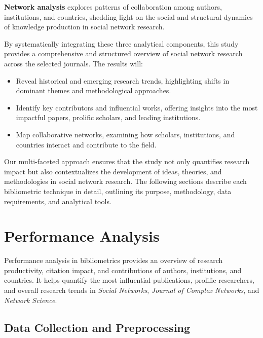 \documentclass[twocolumn]{article}
\begin{document}
	\textbf{Network analysis} explores patterns of collaboration among authors, institutions, and countries, shedding light on the social and structural dynamics of knowledge production in social network research.
	
	By systematically integrating these three analytical components, this study provides a comprehensive and structured overview of social network research across the selected journals. The results will:
	
	\begin{itemize}
		\item Reveal historical and emerging research trends, highlighting shifts in dominant themes and methodological approaches.
		\item Identify key contributors and influential works, offering insights into the most impactful papers, prolific scholars, and leading institutions.
		\item Map collaborative networks, examining how scholars, institutions, and countries interact and contribute to the field.
	\end{itemize}
	
	Our multi-faceted approach ensures that the study not only quantifies research impact but also contextualizes the development of ideas, theories, and methodologies in social network research. The following sections describe each bibliometric technique in detail, outlining its purpose, methodology, data requirements, and analytical tools.
	
	\section{Performance Analysis}\label{Performance Analysis}
	
	Performance analysis in bibliometrics provides an overview of research productivity, citation impact, and contributions of authors, institutions, and countries. It helps quantify the most influential publications, prolific researchers, and overall research trends in \textit{Social Networks}, \textit{Journal of Complex Networks}, and \textit{Network Science}.
	
	\subsection{Data Collection and Preprocessing}
	
\end{document}
